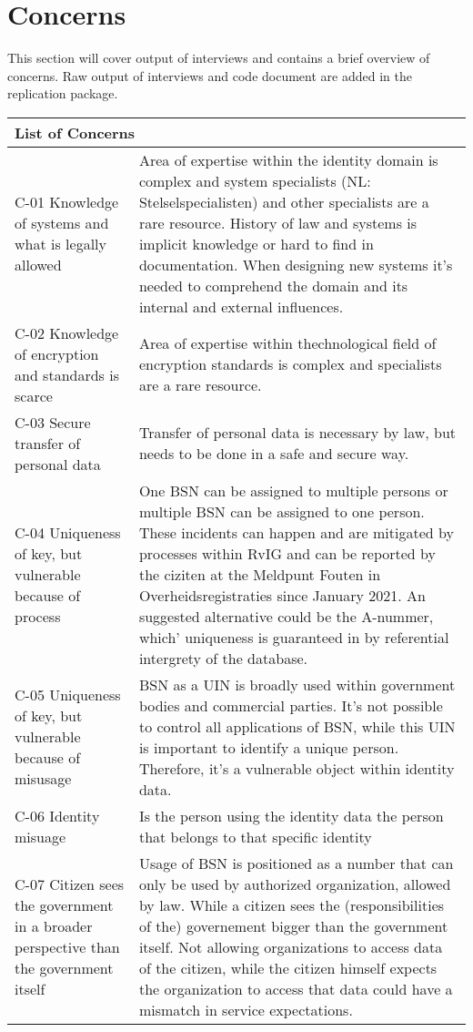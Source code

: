 \clearpage
\section*{Concerns}
This section will cover output of interviews and contains a brief overview of concerns. Raw output of interviews and code document are added in the replication package.

\begin{table}
\begin{tabular}{ |p{5cm}||p{11cm}|}
 \hline
 \multicolumn{2}{|l|}{List of Concerns} \\
 \hline
 C-01 Knowledge of systems and what is legally allowed    &   Area of expertise within the identity domain is complex and system specialists (NL: Stelselspecialisten) and other specialists are a rare resource. History of law and systems is implicit knowledge or hard to find in documentation. When designing new systems it's needed to comprehend the domain and its internal and external influences.       \\
 \hline
 C-02 Knowledge of encryption and standards is scarce &  Area of expertise within thechnological field of encryption standards is complex and specialists are a rare resource. \\
  \hline
 C-03 Secure transfer of personal data  &  Transfer of personal data is necessary by law, but needs to be done in a safe and secure way.  \\
  \hline
C-04 Uniqueness of key, but vulnerable because of process
& One BSN can be assigned to multiple persons or multiple BSN can be assigned to one person. These incidents can happen and are mitigated by processes within RvIG and can be reported by the ciziten at the Meldpunt Fouten in Overheidsregistraties since January 2021. An suggested alternative could be the A-nummer, which' uniqueness is guaranteed in by referential intergrety of the database.
  \\
\hline
C-05 Uniqueness of key, but vulnerable because of misusage & BSN as a UIN is broadly used within government bodies and commercial parties. It's not possible to control all applications of BSN, while this UIN is important to identify a unique person. Therefore, it's a vulnerable object within identity data. \\
\hline
C-06 Identity misuage & Is the person using the identity data the person that belongs to that specific identity\\
\hline
C-07 Citizen sees the government in a broader perspective than the government itself & Usage of BSN is positioned as a number that can only be used by authorized organization, allowed by law. While a citizen sees the (responsibilities of the) governement bigger than the government itself. Not allowing organizations to access data of the citizen, while the citizen himself expects the organization to access that data could have a mismatch in service expectations.\\

\end{tabular}
\end{table}
